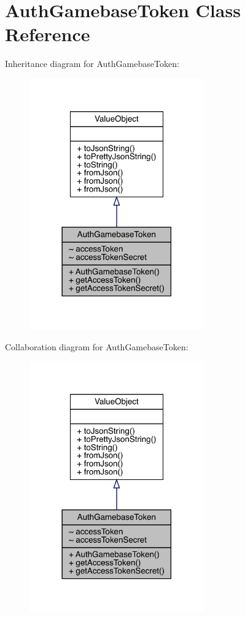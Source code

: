 \hypertarget{classcom_1_1toast_1_1android_1_1gamebase_1_1auth_1_1data_1_1_auth_gamebase_token}{}\section{Auth\+Gamebase\+Token Class Reference}
\label{classcom_1_1toast_1_1android_1_1gamebase_1_1auth_1_1data_1_1_auth_gamebase_token}


Inheritance diagram for Auth\+Gamebase\+Token\+:
\nopagebreak
\begin{figure}[H]
\begin{center}
\leavevmode
\includegraphics[width=213pt]{classcom_1_1toast_1_1android_1_1gamebase_1_1auth_1_1data_1_1_auth_gamebase_token__inherit__graph}
\end{center}
\end{figure}


Collaboration diagram for Auth\+Gamebase\+Token\+:
\nopagebreak
\begin{figure}[H]
\begin{center}
\leavevmode
\includegraphics[width=213pt]{classcom_1_1toast_1_1android_1_1gamebase_1_1auth_1_1data_1_1_auth_gamebase_token__coll__graph}
\end{center}
\end{figure}
